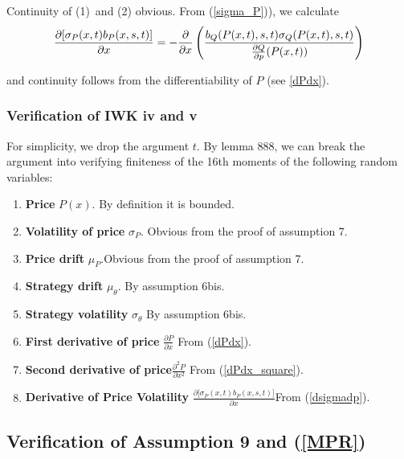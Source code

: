 \documentclass{article}
\begin{document}
Continuity of (1)\ and (2) obvious. From (\ref{sigma_P})), we calculate 
\begin{equation}
\frac{\partial \lbrack \sigma _{P}(x,t)b_{P}(x,s,t)]}{\partial x}=-\frac{%
\partial }{\partial x}\left( \frac{b_{Q}(P(x,t),s,t)\sigma _{Q}(P(x,t),s,t)}{%
\frac{\partial Q}{\partial p}(P(x,t))}\right)   \label{dsigmadp}
\end{equation}

and continuity follows from the differentiability of $P$ (see \ref{dPdx}).

\subsubsection{Verification of IWK iv and v}

For simplicity, we drop the argument $t$. By lemma 888, we can break the
argument into verifying finiteness of the 16th moments of the following
random variables:

\bigskip

\begin{enumerate}
\item \textbf{Price }$P(x).$ By definition it is bounded.

\item \textbf{Volatility of price }$\sigma _{P}$. Obvious from the proof of
assumption 7.

\item \textbf{Price drift }$\mu _{P}.$Obvious from the proof of assumption 7.

\item \textbf{Strategy drift }$\mu _{\theta }.$ By assumption 6bis.

\item \textbf{Strategy volatility }$\sigma _{\theta }$ By assumption 6bis.

\item \textbf{First derivative of price} $\frac{\partial P}{\partial x}$
From (\ref{dPdx}).

\item \textbf{Second derivative of price}$\frac{\partial ^{2}P}{\partial
x^{2}}$ From (\ref{dPdx_square}).

\item \textbf{Derivative of Price Volatility }$\frac{\partial \lbrack \sigma
_{P}(x,t)b_{P}(x,s,t)]}{\partial x}$From (\ref{dsigmadp}).
\end{enumerate}

\subsection{Verification of Assumption 9 and (\protect\ref{MPR})}
\end{document}
